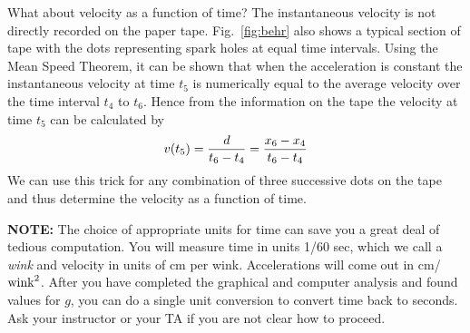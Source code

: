 What about velocity as a function of time?  The instantaneous velocity is not
directly recorded on the paper tape.  Fig.~\ref{fig:behr} also shows a typical
section of tape with the dots representing spark holes at equal time intervals.
Using the Mean Speed Theorem, it can be shown that when the
acceleration is constant the instantaneous velocity at time $t_{5}$ is
numerically equal to the average velocity over the time interval $t_{4}$ to
$t_{6}$.  Hence from the information on the tape the velocity at time $t_{5}$
can be calculated by
\[
v(t_{5}) = {{d} \over {t_{6} - t_{4}}} = {x_6-x_4 \over t_{6} - t_{4}}
\]
We can use this trick for any combination of three successive dots on the tape
and thus determine the velocity as a function of time.

{\bf NOTE:} The choice of appropriate units for time can save you
a great deal of tedious computation. You will measure time
in units 1/60 sec, which we call a {\em wink} and velocity
 in units of cm per wink. Accelerations will come out in
cm/${\rm wink}^2$. After
you have completed the graphical and computer analysis and found
values for $g$, you can do a single unit conversion to
convert time back to seconds.  Ask your instructor or your TA if you
are not clear how to proceed.

